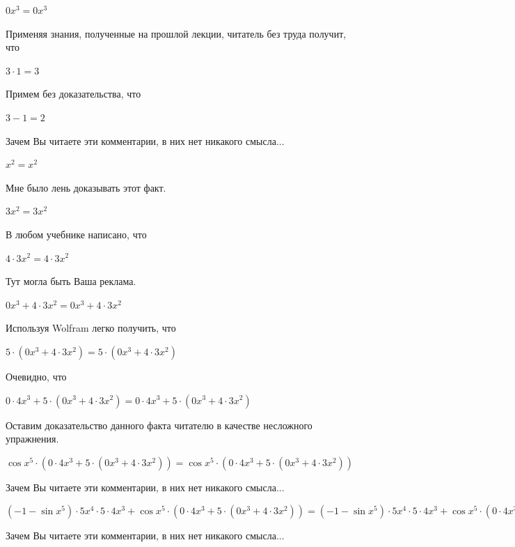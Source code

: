 \documentclass[12pt,a4paper,fleqn]{article}
\theoremstyle{definition}
\begin{document}
$ 0 { x }^{ 3 } =  0 { x }^{ 3 }$

Применяя знания, полученные на прошлой лекции, читатель без труда получит, что 

$ 3  \cdot  1  =  3 $

Примем без доказательства, что 

$ 3  -  1  =  2 $

Зачем Вы читаете эти комментарии, в них нет никакого смысла... 

${ x }^{ 2 } = { x }^{ 2 }$

Мне было лень доказывать этот факт.

$ 3 { x }^{ 2 } =  3 { x }^{ 2 }$

В любом учебнике написано, что 

$ 4  \cdot  3 { x }^{ 2 } =  4  \cdot  3 { x }^{ 2 }$

Тут могла быть Ваша реклама. 

$ 0 { x }^{ 3 } +  4  \cdot  3 { x }^{ 2 } =  0 { x }^{ 3 } +  4  \cdot  3 { x }^{ 2 }$

Используя Wolfram легко получить, что 

$ 5  \cdot ( 0 { x }^{ 3 } +  4  \cdot  3 { x }^{ 2 }) =  5  \cdot ( 0 { x }^{ 3 } +  4  \cdot  3 { x }^{ 2 })$

Очевидно, что 

$ 0  \cdot  4 { x }^{ 3 } +  5  \cdot ( 0 { x }^{ 3 } +  4  \cdot  3 { x }^{ 2 }) =  0  \cdot  4 { x }^{ 3 } +  5  \cdot ( 0 { x }^{ 3 } +  4  \cdot  3 { x }^{ 2 })$

Оставим доказательство данного факта читателю в качестве несложного упражнения. 

$\cos{ x }^{ 5 } \cdot ( 0  \cdot  4 { x }^{ 3 } +  5  \cdot ( 0 { x }^{ 3 } +  4  \cdot  3 { x }^{ 2 })) = \cos{ x }^{ 5 } \cdot ( 0  \cdot  4 { x }^{ 3 } +  5  \cdot ( 0 { x }^{ 3 } +  4  \cdot  3 { x }^{ 2 }))$

Зачем Вы читаете эти комментарии, в них нет никакого смысла... 

$( -1  - \sin{ x }^{ 5 }) \cdot  5 { x }^{ 4 } \cdot  5  \cdot  4 { x }^{ 3 } + \cos{ x }^{ 5 } \cdot ( 0  \cdot  4 { x }^{ 3 } +  5  \cdot ( 0 { x }^{ 3 } +  4  \cdot  3 { x }^{ 2 })) = ( -1  - \sin{ x }^{ 5 }) \cdot  5 { x }^{ 4 } \cdot  5  \cdot  4 { x }^{ 3 } + \cos{ x }^{ 5 } \cdot ( 0  \cdot  4 { x }^{ 3 } +  5  \cdot ( 0 { x }^{ 3 } +  4  \cdot  3 { x }^{ 2 }))$

Зачем Вы читаете эти комментарии, в них нет никакого смысла... 
\end{document}
